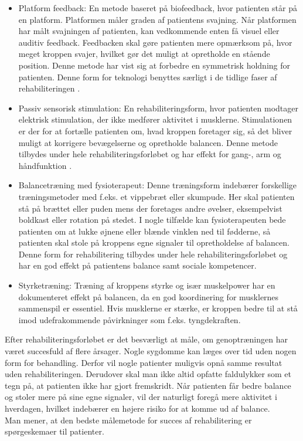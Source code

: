 \begin{itemize}
\item Platform feedback: En metode baseret på biofeedback, hvor patienten står på en platform. Platformen måler graden af patientens svajning. Når platformen har målt svajningen af patienten, kan vedkommende enten få visuel eller auditiv feedback. Feedbacken skal gøre patienten mere opmærksom på, hvor meget kroppen svajer, hvilket gør det muligt at opretholde en stående position. Denne metode har vist sig at forbedre en symmetrisk holdning for patienten. \cite{Barclay-Goddard2004} Denne form for teknologi benyttes særligt i de tidlige faser af rehabiliteringen \cite{Sundhedsstyrelsen2011a}.
\item Passiv sensorisk stimulation: En rehabiliteringsform, hvor patienten modtager elektrisk stimulation, der ikke medfører aktivitet i musklerne. Stimulationen er der for at fortælle patienten om, hvad kroppen foretager sig, så det bliver muligt at korrigere bevægelserne og opretholde balancen. \cite{Sundhedsstyrelsen2010} Denne metode tilbydes under hele rehabiliteringsforløbet og har effekt for gang-, arm og håndfunktion \cite{Sundhedsstyrelsen2011a}.
\item Balancetræning med fysioterapeut: Denne træningsform indebærer forskellige træningsmetoder med f.eks. et vippebræt eller skumpude. Her skal patienten stå på brættet eller puden mens der foretages andre øvelser, eksempelvist boldkast eller rotation på stedet. I nogle tilfælde kan fysioterapeuten bede patienten om at lukke øjnene eller blænde vinklen ned til fødderne, så patienten skal stole på kroppens egne signaler til opretholdelse af balancen. \cite{Joergensen2004} Denne form for rehabilitering tilbydes under hele rehabiliteringsforløbet og har en god effekt på patientens balance samt sociale kompetencer. \cite{Sundhedsstyrelsen2011a}
\item Styrketræning: Træning af kroppens styrke og især muskelpower har en dokumenteret effekt på balancen, da en god koordinering for musklernes sammenspil er essentiel. Hvis musklerne er stærke, er kroppen bedre til at stå imod udefrakommende påvirkninger som f.eks. tyngdekraften. \cite{Joergensen2004}
\end{itemize}

Efter rehabiliteringsforløbet er det besværligt at måle, om genoptræningen har været succesfuld af flere årsager. Nogle sygdomme kan læges over tid uden nogen form for behandling. Derfor vil nogle patienter muligvis opnå samme resultat uden rehabiliteringen. Derudover skal man ikke altid opfatte faldulykker som et tegn på, at patienten ikke har gjort fremskridt. Når patienten får bedre balance og stoler mere på sine egne signaler, vil der naturligt foregå mere aktivitet i hverdagen, hvilket indebærer en højere risiko for at komme ud af balance. \cite{Hain2008} \\
Man mener, at den bedste målemetode for succes af rehabilitering er spørgeskemaer til patienter. \cite{Hain2008}
